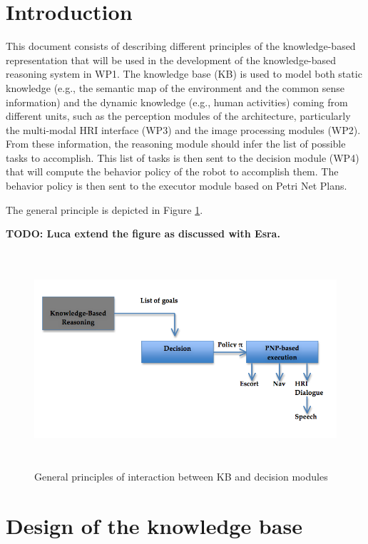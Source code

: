 \documentclass{article}
\begin{document}
\section{Introduction}

This document consists of describing different principles of the knowledge-based representation that will be used in the development of the knowledge-based reasoning system in WP1. The knowledge base (KB) is used to model both static knowledge (e.g., the semantic map of the environment and the common sense information) and the dynamic knowledge (e.g., human activities) coming from different units, such as the perception modules of the architecture, particularly the multi-modal HRI interface (WP3) and the image processing modules (WP2). 
From these information, the reasoning module should infer the list of possible tasks to accomplish. This list of tasks is then sent to the decision module (WP4) that will compute the behavior policy of the robot to accomplish them. The behavior policy is then sent to the executor module based on Petri Net Plans. 

The general principle is depicted in Figure \ref{WP1principle}.

{\bf TODO: Luca extend the figure as discussed with Esra.}

\begin{figure}[htbp]
\begin{center}
\includegraphics[height=8cm]{WP1Principles}
\caption{General principles of interaction between KB  and decision modules}
\label{WP1principle}
\end{center}
\end{figure}


\section{Design of the knowledge base}
\end{document}
